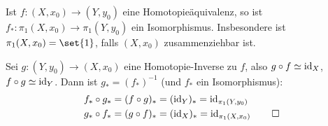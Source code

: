 \begin{korollar}[{name=[Homotopieäquivalenzen induzieren Isomorphismen]}]
	Ist $f \colon (X,x_0) \to (Y,y_0)$ eine Homotopieäquivalenz, so ist $f_* : \pi_1(X,x_0) \to \pi_1(Y,y_0)$ ein Isomorphismus. Insbesondere ist $\pi_1(X,x_0) = \set{1}$, falls $(X,x_0)$ zusammenziehbar ist.
\end{korollar}
\begin{beweis}
	Sei $g \colon (Y, y_0) \to (X,x_0)$ eine Homotopie-Inverse zu $f$, also $ g \circ f \simeq \operatorname{id}_X$, $f \circ g \simeq \operatorname{id}_Y$. Dann ist $g_*= (f_*)^{-1}$ (und $f_*$ ein Isomorphismus):
	\begin{align*}
		f_* \circ g_* &= (f \circ g)_* = (\operatorname{id}_Y)_* = \operatorname{id}_{\pi_1(Y,y_0)} \\
		g_* \circ f_* &= (g \circ f)_* = (\operatorname{id}_X)_* = \operatorname{id}_{\pi_1(X,x_0)} \qedhere
	\end{align*}
\end{beweis}

